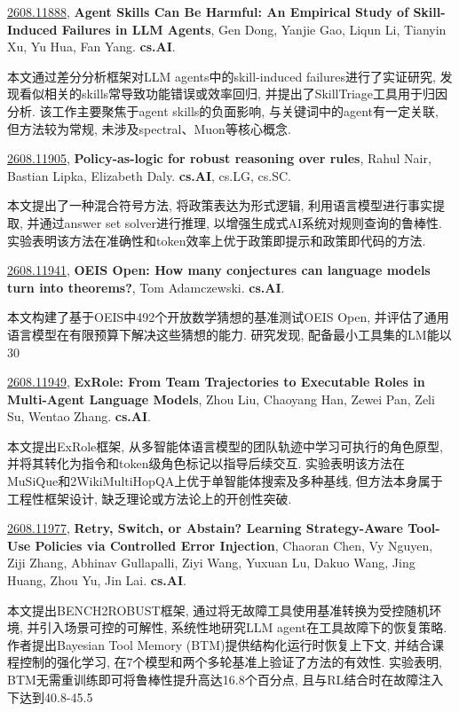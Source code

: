 \documentclass[9pt, a4paper]{article}
\theoremstyle{plain}
\theoremstyle{definition}
\theoremstyle{remark}
\newcommand{\arxivwithtarget}[3]{\hypertarget{#1}{}\href{https://arxiv.org/abs/#1}{#1}, \textbf{\textcolor{arxivblue}{#2}}, #3. }
\begin{document}
\arxivwithtarget{2608.11888}{Agent Skills Can Be Harmful: An Empirical Study of Skill-Induced Failures in LLM Agents}{Gen Dong, Yanjie Gao, Liqun Li, Tianyin Xu, Yu Hua, Fan Yang}\textbf{cs.AI}.

本文通过差分分析框架对LLM agents中的skill-induced failures进行了实证研究, 发现看似相关的skills常导致功能错误或效率回归, 并提出了SkillTriage工具用于归因分析. 该工作主要聚焦于agent skills的负面影响, 与关键词中的agent有一定关联, 但方法较为常规, 未涉及spectral、Muon等核心概念.


\arxivwithtarget{2608.11905}{Policy-as-logic for robust reasoning over rules}{Rahul Nair, Bastian Lipka, Elizabeth Daly}\textbf{cs.AI}, cs.LG, cs.SC.

本文提出了一种混合符号方法, 将政策表达为形式逻辑, 利用语言模型进行事实提取, 并通过answer set solver进行推理, 以增强生成式AI系统对规则查询的鲁棒性. 实验表明该方法在准确性和token效率上优于政策即提示和政策即代码的方法.


\arxivwithtarget{2608.11941}{OEIS Open: How many conjectures can language models turn into theorems?}{Tom Adamczewski}\textbf{cs.AI}.

本文构建了基于OEIS中492个开放数学猜想的基准测试OEIS Open, 并评估了通用语言模型在有限预算下解决这些猜想的能力. 研究发现, 配备最小工具集的LM能以30%


\arxivwithtarget{2608.11949}{ExRole: From Team Trajectories to Executable Roles in Multi-Agent Language Models}{Zhou Liu, Chaoyang Han, Zewei Pan, Zeli Su, Wentao Zhang}\textbf{cs.AI}.

本文提出ExRole框架, 从多智能体语言模型的团队轨迹中学习可执行的角色原型, 并将其转化为指令和token级角色标记以指导后续交互. 实验表明该方法在MuSiQue和2WikiMultiHopQA上优于单智能体搜索及多种基线, 但方法本身属于工程性框架设计, 缺乏理论或方法论上的开创性突破.


\arxivwithtarget{2608.11977}{Retry, Switch, or Abstain? Learning Strategy-Aware Tool-Use Policies via Controlled Error Injection}{Chaoran Chen, Vy Nguyen, Ziji Zhang, Abhinav Gullapalli, Ziyi Wang, Yuxuan Lu, Dakuo Wang, Jing Huang, Zhou Yu, Jin Lai}\textbf{cs.AI}.

本文提出BENCH2ROBUST框架, 通过将无故障工具使用基准转换为受控随机环境, 并引入场景可控的可解性, 系统性地研究LLM agent在工具故障下的恢复策略. 作者提出Bayesian Tool Memory (BTM)提供结构化运行时恢复上下文, 并结合课程控制的强化学习, 在7个模型和两个多轮基准上验证了方法的有效性. 实验表明, BTM无需重训练即可将鲁棒性提升高达16.8个百分点, 且与RL结合时在故障注入下达到40.8-45.5%
\end{document}
